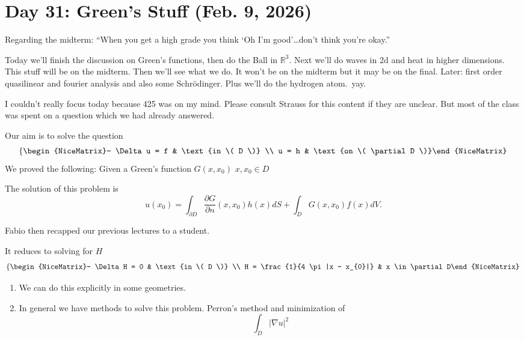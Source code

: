 \section{Day 31: Green's Stuff (Feb. 9, 2026)}
Regarding the midterm: ``When you get a high grade you think `Oh I'm good'\ldots don't think you're okay.''

Today we'll finish the discussion on Green's functions, then do the Ball in \( \mathbb{R}^{3} \). Next we'll do waves in 2d and heat in higher dimensions. This stuff will be on the midterm. Then we'll see what we do. It won't be on the midterm but it may be on the final. Later: first order quasilinear and fourier analysis and also some Schr\"odinger. Plus we'll do the hydrogen atom.\ yay.

I couldn't really focus today because 425 was on my mind. Please consult Strauss for this content if they are unclear. But most of the class was spent on a question which we had already answered.

Our aim is to solve the question
\[ \left\{\begin{NiceMatrix}- \Delta u = f & \text{in \( D \)} \\ u = h & \text{on \( \partial D \)}\end{NiceMatrix}\right.  \]
We proved the following: Given a Green's function \( G(x, x_{0}) \) \( x, x_{0} \in D \)
\begin{theorem}
	The solution of this problem is
	\[ u(x_{0}) = \int_{\partial D} \frac{\partial G}{\partial n}(x, x_{0}) h(x) dS + \int_{D} G(x, x_{0}) f(x) dV.  \]
\end{theorem}
Fabio then recapped our previous lectures to a student.

It reduces to solving for \( H \)
\[ \left\{\begin{NiceMatrix}- \Delta H = 0 & \text{in \( D \)} \\ H = \frac{1}{4 \pi |x - x_{0}|} & x \in \partial D\end{NiceMatrix}\right. \]
\begin{enumerate}

	\item We can do this explicitly in some geometries.
	\item In general we have methods to solve this problem. Perron's method and minimization of
		\[ \int_{D} |\nabla u|^{2}  \]

\end{enumerate}


